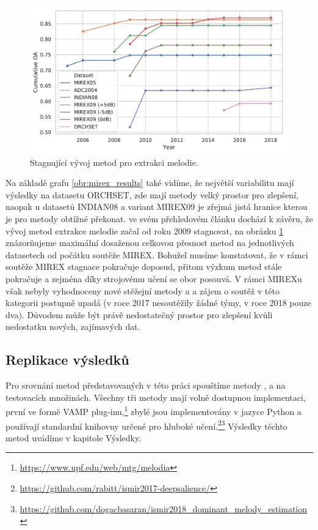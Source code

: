 \begin{figure}[h]\centering
\includegraphics[scale=0.5]{../img/mirex_results_cumulative}
\caption{Stagnující vývoj metod pro extrakci melodie.}
\label{obr:mirex_results_cumulative}
\end{figure}

Na základě grafu \ref{obr:mirex_results} také vidíme, že největší variabilitu mají výsledky na datasetu ORCHSET, zde mají metody velký prostor pro zlepšení, naopak u datasetů INDIAN08 a variant MIREX09 je zřejmá jistá hranice kterou je pro metody obtížné překonat. \cite{Salamon2014} ve svém přehledovém článku dochází k závěru, že vývoj metod extrakce melodie začal od roku 2009 stagnovat, na obrázku \ref{obr:mirex_results_cumulative} znázorňujeme maximální dosaženou celkovou přesnost metod na jednotlivých datasetech od počátku soutěže MIREX. Bohužel musíme konstatovat, že v rámci soutěže MIREX stagnace pokračuje doposud, přitom výzkum metod stále pokračuje a zejména díky strojovému učení se obor posouvá. V rámci MIREXu však nebyly vyhodnoceny nové stěžejní metody \cite{Bittner2017} a \cite{DBasaranSEssid2018} a zájem o soutěž v této kategorii postupně upadá (v roce 2017 nesoutěžily žádné týmy, v roce 2018 pouze dva). Důvodem může být právě nedostatečný prostor pro zlepšení kvůli nedostatku nových, zajímavých dat.


\subsection{Replikace výsledků}

Pro srovnání metod představovaných v této práci spouštíme metody \cite{Salamon2012a}, \cite{Bittner2017} a \cite{DBasaranSEssid2018} na testovacích množinách. Všechny tři metody mají volně dostupnou implementaci, první ve formě VAMP plug-inu,\footnote{\url{https://www.upf.edu/web/mtg/melodia}} zbylé jsou implementovány v jazyce Python a používají standardní knihovny určené pro hluboké učení.\footnote{\url{https://github.com/rabitt/ismir2017-deepsalience/}}\footnote{\url{https://github.com/dogacbasaran/ismir2018_dominant_melody_estimation}} Výsledky těchto metod uvádíme v kapitole Výsledky.


